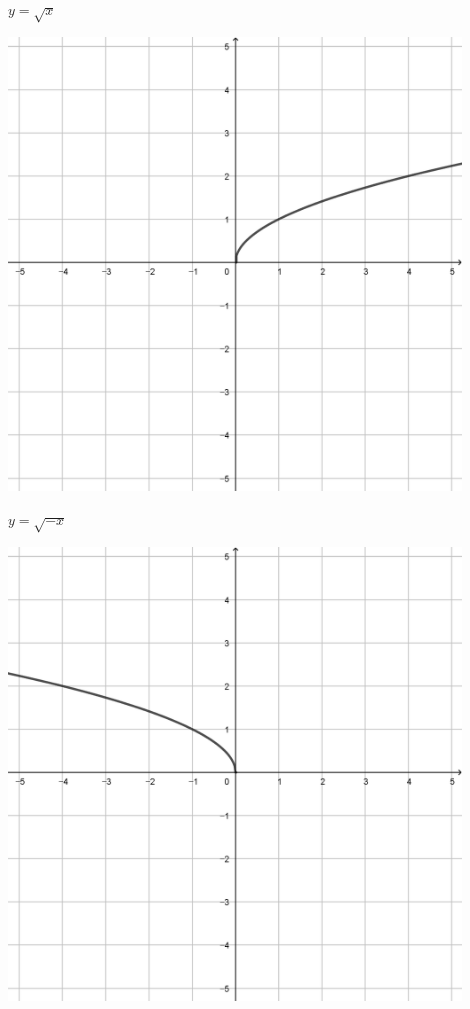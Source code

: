 \documentclass[a4paper]{oblivoir}
\begin{document}
\clearpage
\begin{minipage}{0.45\textwidth}\centering
\(y=\sqrt x\)
\par\bigskip\includegraphics[width=0.9\textwidth]{img/5_irrational_1}
\end{minipage}
\begin{minipage}{0.45\textwidth}\centering
\(y=\sqrt{-x}\)
\par\bigskip\includegraphics[width=0.9\textwidth]{img/5_irrational_2}
\end{minipage}\bigskip\bigskip\par
\end{document}
